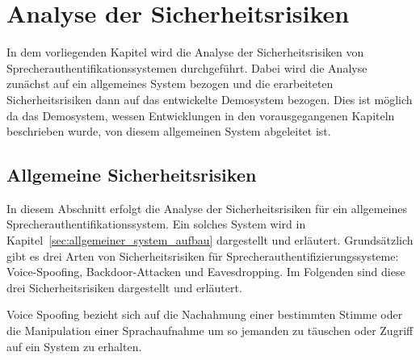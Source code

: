 \section{Analyse der Sicherheitsrisiken}
In dem vorliegenden Kapitel wird die Analyse der Sicherheitsrisiken von Sprecherauthentifikationssystemen durchgeführt.
Dabei wird die Analyse zunächst auf ein allgemeines System bezogen und die erarbeiteten Sicherheitsrisiken dann auf das entwickelte Demosystem bezogen.
Dies ist möglich da das Demosystem, wessen Entwicklungen in den vorausgegangenen Kapiteln beschrieben wurde, von diesem allgemeinen System abgeleitet ist.

\subsection{Allgemeine Sicherheitsrisiken}
In diesem Abschnitt erfolgt die Analyse der Sicherheitsrisiken für ein allgemeines Sprecherauthentifikationssystem.
Ein solches System wird in Kapitel~\ref{sec:allgemeiner_system_aufbau} dargestellt und erläutert.
Grundsätzlich gibt es drei Arten von Sicherheitsrisiken für Sprecherauthentifizierungssysteme: Voice-Spoofing, Backdoor-Attacken und Eavesdropping.
Im Folgenden sind diese drei Sicherheitsrisiken dargestellt und erläutert.

Voice Spoofing bezieht sich auf die Nachahmung einer bestimmten Stimme oder die Manipulation einer Sprachaufnahme um so jemanden zu täuschen oder Zugriff auf ein System zu erhalten.


















































































